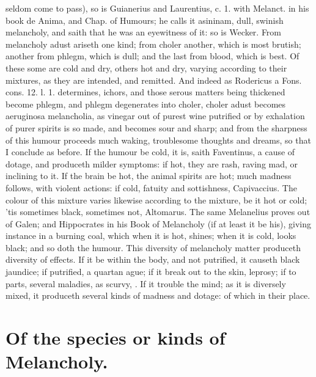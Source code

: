 {seldom come to pass), so is Guianerius and Laurentius, c. 1. with
Melanct. in his book de Anima, and Chap. of Humours; he calls it
asininam, dull, swinish melancholy, and saith that he was an eyewitness
of it: so is Wecker. From melancholy adust ariseth one kind; from
choler another, which is most brutish; another from phlegm, which is
dull; and the last from blood, which is best. Of these some are cold
and dry, others hot and dry, varying according to their mixtures,
as they are intended, and remitted. And indeed as Rodericus a Fons.
cons. 12. l. 1. determines, ichors, and those serous matters being
thickened become phlegm, and phlegm degenerates into choler, choler
adust becomes aeruginosa melancholia, as vinegar out of purest wine
putrified or by exhalation of purer spirits is so made, and becomes
sour and sharp; and from the sharpness of this humour proceeds much
waking, troublesome thoughts and dreams, \etc{} so that I conclude as
before. If the humour be cold, it is, saith Faventinus, a cause
of dotage, and produceth milder symptoms: if hot, they are rash, raving
mad, or inclining to it. If the brain be hot, the animal spirits are
hot; much madness follows, with violent actions: if cold, fatuity and
sottishness, Capivaccius. The colour of this mixture varies
likewise according to the mixture, be it hot or cold; 'tis sometimes
black, sometimes not, Altomarus. The same Melanelius proves out
of Galen; and Hippocrates in his Book of Melancholy (if at least it be
his), giving instance in a burning coal, which when it is hot, shines;
when it is cold, looks black; and so doth the humour. This diversity of
melancholy matter produceth diversity of effects. If it be within the
body, and not putrified, it causeth black jaundice; if putrified,
a quartan ague; if it break out to the skin, leprosy; if to parts,
several maladies, as scurvy, \etc{}. If it trouble the mind; as it is
diversely mixed, it produceth several kinds of madness and dotage: of
which in their place.

\section{Of the species or kinds of Melancholy.}

}
